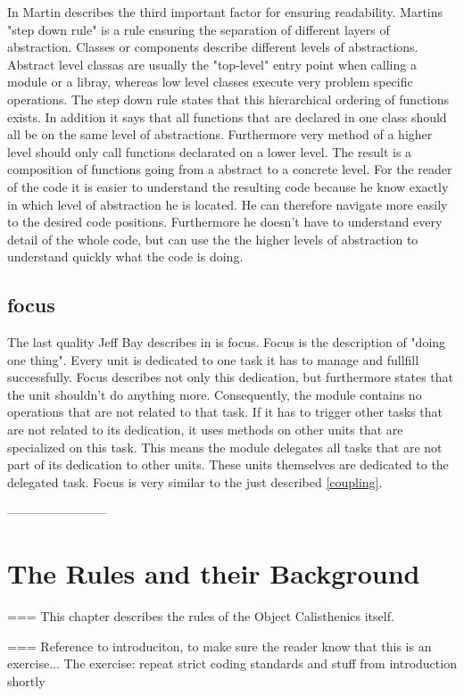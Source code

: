 In \cite{cc} Martin describes the third important factor for ensuring readability. Martins "step down rule" is a rule ensuring the separation of different layers of abstraction. Classes or components describe different levels of abstractions. Abstract level classas are usually the "top-level" entry point when calling a module or a libray, whereas low level classes execute very problem specific operations. The step down rule states that this hierarchical ordering of functions exists. In addition it says that all functions that are declared in one class should all be on the same level of abstractions. Furthermore very method of a higher level should only call functions declarated on a lower level. The result is a composition of functions going from a abstract to a concrete level. For the reader of the code it is easier to understand the resulting code because he know exactly in which level of abstraction he is located. He can therefore navigate more easily to the desired code positions. Furthermore he doesn't have to understand every detail of the whole code, but can use the the higher levels of abstraction to understand quickly what the code is doing. 

\subsection{focus}
The last quality Jeff Bay describes in \cite{oc2008} is focus. Focus is the description of "doing one thing". Every unit is dedicated to one task it has to manage and fullfill successfully. Focus describes not only this dedication, but furthermore states that the unit shouldn't do anything more. Consequently, the module contains no operations that are not related to that task. If it has to trigger other tasks that are not related to its dedication, it uses methods on other units that are specialized on this task. This means the module delegates all tasks that are not part of its dedication to other units. These units themselves are dedicated to the delegated task. Focus is very similar to the just described \ref{coupling}.

------------------------

\section{The Rules and their Background}
\label{d:background}
=== This chapter describes the rules of the Object Calisthenics itself. 

=== Reference to introduciton, to make sure the reader know that this is an exercise... The exercise: repeat strict coding standards and stuff from introduction shortly


